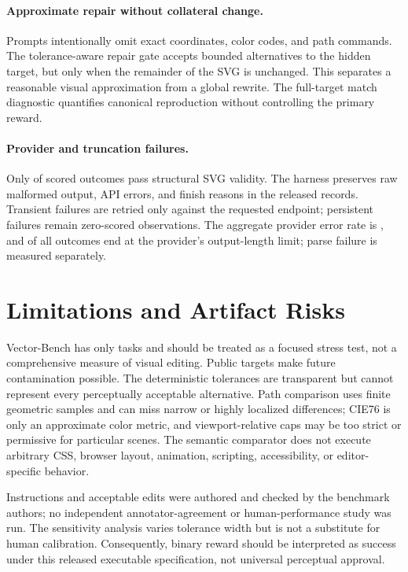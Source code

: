 \documentclass[11pt]{article}
\begin{document}
\paragraph{Approximate repair without collateral change.}
Prompts intentionally omit exact coordinates, color codes, and path commands.
The tolerance-aware repair gate accepts bounded alternatives to the hidden target,
but only when the remainder of the SVG is unchanged. This separates a reasonable
visual approximation from a global rewrite. The full-target match diagnostic
quantifies canonical reproduction without controlling the primary reward.

\paragraph{Provider and truncation failures.}
Only \OverallValidity{} of scored outcomes pass structural SVG validity. The harness
preserves raw malformed output, API errors, and finish reasons in the released
records. Transient failures are retried only against the requested endpoint;
persistent failures remain zero-scored observations. The aggregate provider
error rate is \OverallErrorRate{}, and \OverallTruncationRate{} of all outcomes
end at the provider's output-length limit; parse failure is measured separately.

\section{Limitations and Artifact Risks}

Vector-Bench has only \TaskCount{} tasks and should be treated as a focused
stress test, not a comprehensive measure of visual editing. Public targets make
future contamination possible. The deterministic tolerances are transparent but
cannot represent every perceptually acceptable alternative. Path comparison uses
finite geometric samples and can miss narrow or highly localized differences;
CIE76 is only an approximate color metric, and viewport-relative caps may be too
strict or permissive for particular scenes. The semantic comparator does not
execute arbitrary CSS, browser layout, animation, scripting, accessibility, or
editor-specific behavior.

Instructions and acceptable edits were authored and checked by the benchmark
authors; no independent annotator-agreement or human-performance study was run.
The sensitivity analysis varies tolerance width but is not a substitute for
human calibration. Consequently, binary reward should be interpreted as success
under this released executable specification, not universal perceptual approval.
\end{document}
